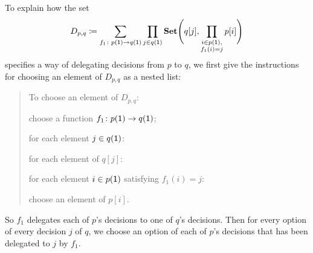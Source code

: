 \documentclass[Book-Poly]{subfiles}
\begin{document}
\begin{exercise}
\begin{solution}
\begin{longenum}
\item To explain how the set
\[
	D_{p,q} \coloneqq \sum_{f_1\colon p(\textsf{1})\to q(\textsf{1})}\prod_{j\in q(\textsf{1})}\textbf{Set}\Bigg(q[j],\prod_{\substack{i \in p(\textsf{1}), \\ f_1(i) = j}}p[i]\Bigg)
\]
specifies a way of delegating decisions from $p$ to $q$, we first give the instructions for choosing an element of $D_{p,q}$ as a nested list:
\begin{quote}
To choose an element of $D_{p,q}$:
\begin{longenum}
    \item choose a function $f_1 \colon p(\textsf{1}) \to q(\textsf{1})$;
    \item for each element $j \in q(\textsf{1})$:
    \begin{longenum}
        \item for each element of $q[j]$:
        \begin{longenum}
            \item for each element $i \in p(\textsf{1})$ satisfying $f_1(i) = j$:
            \begin{longenum}
                \item choose an element of $p[i]$.
            \end{longenum}
        \end{longenum}
    \end{longenum}
\end{longenum}
\end{quote}
So $f_1$ delegates each of $p$'s decisions to one of $q$'s decisions.
Then for every option of every decision $j$ of $q$, we choose an option of each of $p$'s decisions that has been delegated to $j$ by $f_1$.
\end{longenum}
\end{solution}
\end{exercise}
\end{document}
